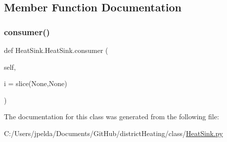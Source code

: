 \subsection{Member Function Documentation}
\mbox{\label{class_heat_sink_1_1_heat_sink_a10c8205c614c016c724f51c350b6ec18}} 
\subsubsection{\texorpdfstring{consumer()}{consumer()}}
{\footnotesize\ttfamily def Heat\+Sink.\+Heat\+Sink.\+consumer (\begin{DoxyParamCaption}\item[{}]{self,  }\item[{}]{i = {\ttfamily slice(None,None)} }\end{DoxyParamCaption})}



The documentation for this class was generated from the following file\+:\begin{DoxyCompactItemize}
\item 
C\+:/\+Users/jpelda/\+Documents/\+Git\+Hub/district\+Heating/class/\hyperlink{_heat_sink_8py}{Heat\+Sink.\+py}\end{DoxyCompactItemize}
